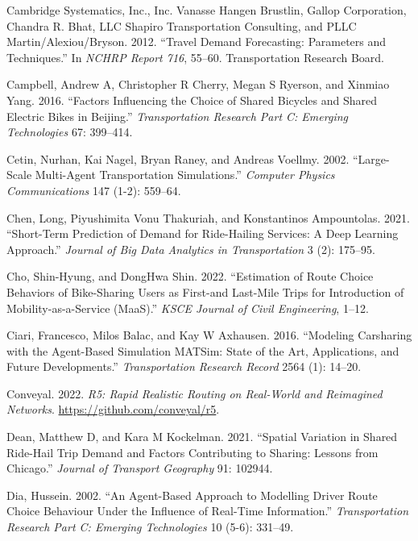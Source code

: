 \documentclass[12pt, oneside, openright]{byuthesis}
\newlength{\cslhangindent}
\newlength{\cslentryspacingunit} %
\newenvironment{CSLReferences}[2] %
 {%
  \setlength{\parindent}{0pt}
  \ifodd #1
  \let\oldpar\par
  \def\par{\hangindent=\cslhangindent\oldpar}
  \fi
  \setlength{\parskip}{#2\cslentryspacingunit}
 }%
 {}
\begin{document}
\begin{CSLReferences}{1}{0}
\leavevmode{}%
Cambridge Systematics, Inc., Inc. Vanasse Hangen Brustlin, Gallop Corporation, Chandra R. Bhat, LLC Shapiro Transportation Consulting, and PLLC Martin/Alexiou/Bryson. 2012. {``Travel Demand Forecasting: Parameters and Techniques.''} In \emph{NCHRP Report 716}, 55--60. Transportation Research Board.

\leavevmode{}%
Campbell, Andrew A, Christopher R Cherry, Megan S Ryerson, and Xinmiao Yang. 2016. {``Factors Influencing the Choice of Shared Bicycles and Shared Electric Bikes in Beijing.''} \emph{Transportation Research Part C: Emerging Technologies} 67: 399--414.

\leavevmode{}%
Cetin, Nurhan, Kai Nagel, Bryan Raney, and Andreas Voellmy. 2002. {``Large-Scale Multi-Agent Transportation Simulations.''} \emph{Computer Physics Communications} 147 (1-2): 559--64.

\leavevmode{}%
Chen, Long, Piyushimita Vonu Thakuriah, and Konstantinos Ampountolas. 2021. {``Short-Term Prediction of Demand for Ride-Hailing Services: A Deep Learning Approach.''} \emph{Journal of Big Data Analytics in Transportation} 3 (2): 175--95.

\leavevmode{}%
Cho, Shin-Hyung, and DongHwa Shin. 2022. {``Estimation of Route Choice Behaviors of Bike-Sharing Users as First-and Last-Mile Trips for Introduction of Mobility-as-a-Service (MaaS).''} \emph{KSCE Journal of Civil Engineering}, 1--12.

\leavevmode{}%
Ciari, Francesco, Milos Balac, and Kay W Axhausen. 2016. {``Modeling Carsharing with the Agent-Based Simulation MATSim: State of the Art, Applications, and Future Developments.''} \emph{Transportation Research Record} 2564 (1): 14--20.

\leavevmode{}%
Conveyal. 2022. \emph{R5: Rapid Realistic Routing on Real-World and Reimagined Networks}. \url{https://github.com/conveyal/r5}.

\leavevmode{}%
Dean, Matthew D, and Kara M Kockelman. 2021. {``Spatial Variation in Shared Ride-Hail Trip Demand and Factors Contributing to Sharing: Lessons from Chicago.''} \emph{Journal of Transport Geography} 91: 102944.

\leavevmode{}%
Dia, Hussein. 2002. {``An Agent-Based Approach to Modelling Driver Route Choice Behaviour Under the Influence of Real-Time Information.''} \emph{Transportation Research Part C: Emerging Technologies} 10 (5-6): 331--49.


\end{CSLReferences}
\end{document}
